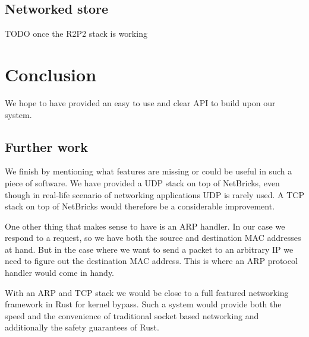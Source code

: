 \documentclass[11pt]{article}
\begin{document}
\subsection{Networked store}

TODO once the R2P2 stack is working

\section{Conclusion}

We hope to have provided an easy to use and clear API to build upon
our system.

\subsection{Further work}

We finish by mentioning what features are missing or could be useful
in such a piece of software. We have provided a UDP stack on top of
NetBricks, even though in real-life scenario of networking
applications UDP is rarely used. A TCP stack on top of NetBricks would
therefore be a considerable improvement.

One other thing that makes sense to have is an ARP handler. In our
case we respond to a request, so we have both the source and
destination MAC addresses at hand. But in the case where we want to
send a packet to an arbitrary IP we need to figure out the destination
MAC address. This is where an ARP protocol handler would come in
handy.

With an ARP and TCP stack we would be close to a full featured
networking framework in Rust for kernel bypass. Such a system would
provide both the speed and the convenience of traditional socket based
networking and additionally the safety guarantees of Rust.
\end{document}
